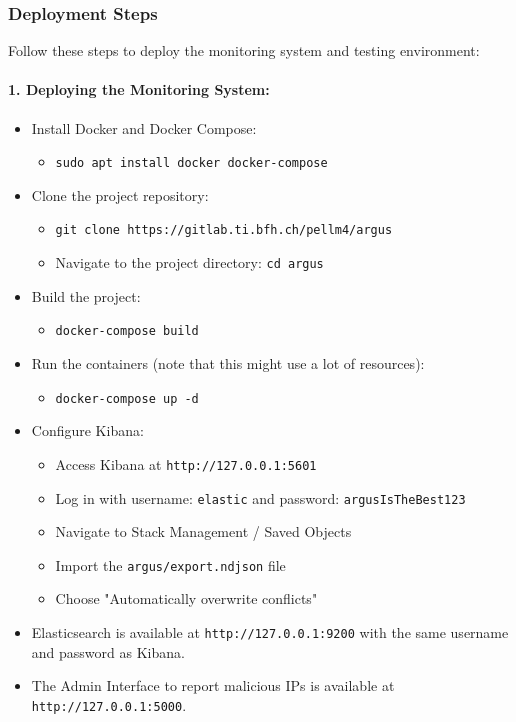 \documentclass{article}
\begin{document}
    \subsubsection{Deployment Steps}\label{subsubsec:deployment-steps}

    Follow these steps to deploy the monitoring system and testing environment:

    \paragraph{1. Deploying the Monitoring System:}
    \begin{itemize}
        \item Install Docker and Docker Compose:
        \begin{itemize}
            \item \texttt{sudo apt install docker docker-compose}
        \end{itemize}
        \item Clone the project repository:
        \begin{itemize}
            \item \texttt{git clone https://gitlab.ti.bfh.ch/pellm4/argus}
            \item Navigate to the project directory: \texttt{cd argus}
        \end{itemize}
        \item Build the project:
        \begin{itemize}
            \item \texttt{docker-compose build}
        \end{itemize}
        \item Run the containers (note that this might use a lot of resources):
        \begin{itemize}
            \item \texttt{docker-compose up -d}
        \end{itemize}
        \item Configure Kibana:
        \begin{itemize}
            \item Access Kibana at \texttt{http://127.0.0.1:5601}
            \item Log in with username: \texttt{elastic} and password: \texttt{argusIsTheBest123}
            \item Navigate to Stack Management / Saved Objects
            \item Import the \texttt{argus/export.ndjson} file
            \item Choose "Automatically overwrite conflicts"
        \end{itemize}
        \item Elasticsearch is available at \texttt{http://127.0.0.1:9200} with the same username and password as Kibana.
        \item The Admin Interface to report malicious IPs is available at \texttt{http://127.0.0.1:5000}.
    \end{itemize}
\end{document}

